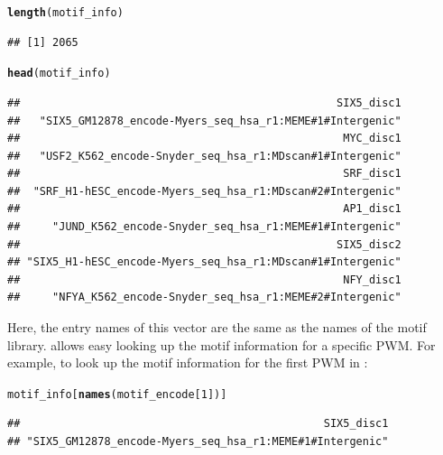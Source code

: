 \documentclass[a4paper,10pt]{article}\usepackage[]{graphicx}\usepackage[]{color}
\makeatletter
\newcommand{\hlnum}[1]{\textcolor[rgb]{0.686,0.059,0.569}{#1}}%
\newcommand{\hlstd}[1]{\textcolor[rgb]{0.345,0.345,0.345}{#1}}%
\newcommand{\hlkwd}[1]{\textcolor[rgb]{0.737,0.353,0.396}{\textbf{#1}}}%
\newenvironment{kframe}{%
 \def\at@end@of@kframe{}%
 \ifinner\ifhmode%
  \def\at@end@of@kframe{\end{minipage}}%
  \begin{minipage}{\columnwidth}%
 \fi\fi%
 \def\FrameCommand##1{\hskip\@totalleftmargin \hskip-\fboxsep
 \colorbox{shadecolor}{##1}\hskip-\fboxsep
     \hskip-\linewidth \hskip-\@totalleftmargin \hskip\columnwidth}%
 \MakeFramed {\advance\hsize-\width
   \@totalleftmargin\z@ \linewidth\hsize
   \@setminipage}}%
 {\par\unskip\endMakeFramed%
 \at@end@of@kframe}
\newenvironment{knitrout}{}{} %
\makeatother
\begin{document}
\begin{knitrout}
\color{fgcolor}\begin{kframe}
\begin{alltt}
\hlkwd{length}\hlstd{(motif_info)}
\end{alltt}
\begin{verbatim}
## [1] 2065
\end{verbatim}
\begin{alltt}
\hlkwd{head}\hlstd{(motif_info)}
\end{alltt}
\begin{verbatim}
##                                                 SIX5_disc1 
##   "SIX5_GM12878_encode-Myers_seq_hsa_r1:MEME#1#Intergenic" 
##                                                  MYC_disc1 
##   "USF2_K562_encode-Snyder_seq_hsa_r1:MDscan#1#Intergenic" 
##                                                  SRF_disc1 
##  "SRF_H1-hESC_encode-Myers_seq_hsa_r1:MDscan#2#Intergenic" 
##                                                  AP1_disc1 
##     "JUND_K562_encode-Snyder_seq_hsa_r1:MEME#1#Intergenic" 
##                                                 SIX5_disc2 
## "SIX5_H1-hESC_encode-Myers_seq_hsa_r1:MDscan#1#Intergenic" 
##                                                  NFY_disc1 
##     "NFYA_K562_encode-Snyder_seq_hsa_r1:MEME#2#Intergenic"
\end{verbatim}
\end{kframe}
\end{knitrout}

Here, the entry names of this vector are the same as the names of the motif library.  allows easy looking up the motif information for a specific PWM. For example, to look up the motif information for the first PWM in :

\begin{knitrout}
\color{fgcolor}\begin{kframe}
\begin{alltt}
\hlstd{motif_info[}\hlkwd{names}\hlstd{(motif_encode[}\hlnum{1}\hlstd{])]}
\end{alltt}
\begin{verbatim}
##                                               SIX5_disc1 
## "SIX5_GM12878_encode-Myers_seq_hsa_r1:MEME#1#Intergenic"
\end{verbatim}
\end{kframe}
\end{knitrout}
\end{document}
